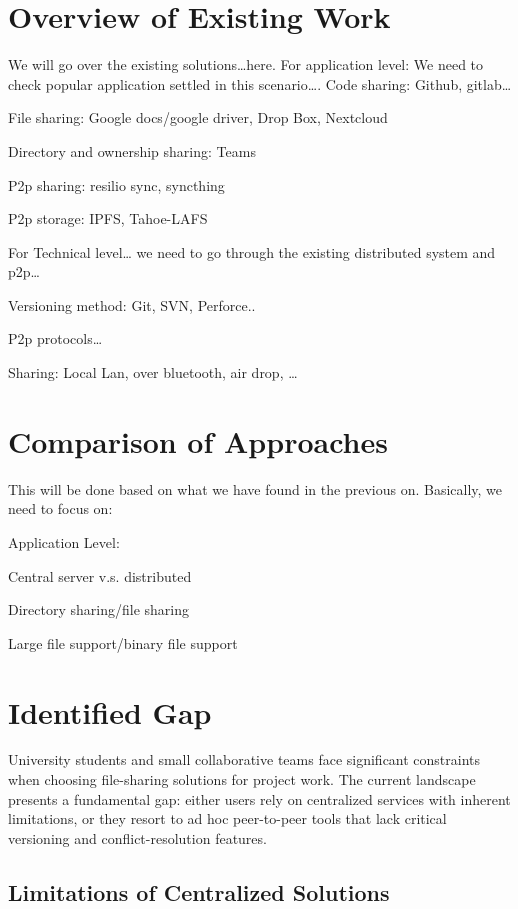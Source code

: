 \documentclass[11pt,oneside]{article}
\begin{document}
\section{Overview of Existing Work}
We will go over the existing solutions…here.
For application level: We need to check popular application settled in this scenario….
Code sharing: Github, gitlab…

File sharing: Google docs/google driver, Drop Box, Nextcloud

Directory and ownership sharing: Teams

P2p sharing: resilio sync, syncthing

P2p storage: IPFS, Tahoe-LAFS

For Technical level… we need to go through the existing distributed system and p2p…

Versioning method: Git, SVN, Perforce..

P2p protocols…

Sharing: Local Lan, over bluetooth, air drop, …
\section{Comparison of Approaches}
This will be done based on what we have found in the previous on. Basically, we need to focus on:

Application Level:

Central server v.s. distributed

Directory sharing/file sharing

Large file support/binary file support
\section{Identified Gap}

University students and small collaborative teams face significant constraints when choosing file-sharing solutions for project work. The current landscape presents a fundamental gap: either users rely on centralized services with inherent limitations, or they resort to ad hoc peer-to-peer tools that lack critical versioning and conflict-resolution features.

\subsection{Limitations of Centralized Solutions}
\end{document}
